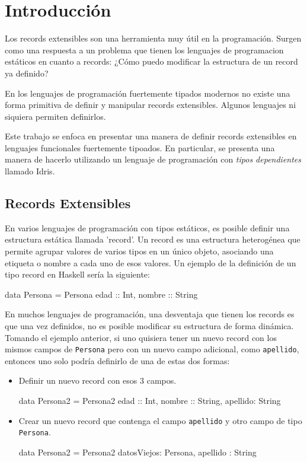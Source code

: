 
\chapter{Introducción}
\label{ch:1}

Los records extensibles son una herramienta muy útil en la programación. Surgen como una respuesta a un problema que tienen los lenguajes de programacion estáticos en cuanto a records: ¿Cómo puedo modificar la estructura de un record ya definido?

En los lenguajes de programación fuertemente tipados modernos no existe una forma primitiva de definir y manipular records extensibles. Algunos lenguajes ni siquiera permiten definirlos.

Este trabajo se enfoca en presentar una manera de definir records extensibles en lenguajes funcionales fuertemente tipoados. En particular, se presenta una manera de hacerlo utilizando un lenguaje de programación con \textit{tipos dependientes} llamado Idris.

\section{Records Extensibles}

En varios lenguajes de programación con tipos estáticos, es posible definir una estructura estática llamada 'record'. Un record es una estructura heterogénea que permite agrupar valores de varios tipos en un único objeto, asociando una etiqueta o nombre a cada uno de esos valores.
Un ejemplo de la definición de un tipo record en Haskell sería la siguiente:

\begin{code}
data Persona = Persona { edad :: Int, nombre :: String}
\end{code}

En muchos lenguajes de programación, una desventaja que tienen los records es que una vez definidos, no es posible modificar su estructura de forma dinámica. Tomando el ejemplo anterior, si uno quisiera tener un nuevo record con los mismos campos de \texttt{Persona} pero con un nuevo campo adicional, como \texttt{apellido}, entonces uno solo podría definirlo de una de estas dos formas:
\begin{itemize}[noitemsep]
\item Definir un nuevo record con esos 3 campos.
\begin{code}
data Persona2 = Persona2 { 
  edad :: Int, 
  nombre :: String, 
  apellido: String
}
\end{code}
\item Crear un nuevo record que contenga el campo \texttt{apellido} y otro campo de tipo \texttt{Persona}.
\begin{code}
data Persona2 = Persona2 { 
  datosViejos: Persona, 
  apellido : String
}
\end{code}
\end{itemize}

